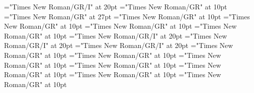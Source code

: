 \documentclass[a4paper]{article}
\begin{document}
\pagestyle{plain}
\sloppy
\setlength{\parfillskip}{0pt plus 1fil}
\font\pronunciationenUKpronunciationbefore="Times New Roman/GR/I" at 20pt
\font\sectionletterdictionary="Times New Roman/GR" at 10pt
\font\headsectionletterdictionary="Times New Roman/GR" at 27pt
\font\articledictionary="Times New Roman/GR" at 10pt
\font\firstoftypeheadwordlastoftypearticledictionary="Times New Roman/GR" at 10pt
\font\firstoftypegrammarrequireslastoftypearticledictionary="Times New Roman/GR" at 10pt
\font\firstoftypelastoftyperelationsynonymarticledictionary="Times New Roman/GR" at 10pt
\font\firstoftypepronunciationenUKarticledictionary="Times New Roman/GR/I" at 20pt
\font\lastoftypepronunciationenUSarticledictionary="Times New Roman/GR/I" at 20pt
\font\lastoftypepronunciationenUKarticledictionary="Times New Roman/GR/I" at 20pt
\font\firstoftypegrammarcategorylastoftypearticledictionary="Times New Roman/GR" at 10pt
\font{}="Times New Roman/GR" at 10pt
\font\firstoftypelastoftypenotearticledictionary="Times New Roman/GR" at 10pt
\font\exampleusefirstoftypearticledictionary="Times New Roman/GR" at 10pt
\font\examplefirstoftypearticledictionary="Times New Roman/GR" at 10pt
\font\exampleuselastoftypearticledictionary="Times New Roman/GR" at 10pt
\font\examplelastoftypearticledictionary="Times New Roman/GR" at 10pt

\mbox{} 
\newpage 
\newpage 
\setcounter{page}{1} 
\pagestyle{fancy} 
\begin{center}
\end{center}

\lastoftypepronunciationenUSarticledictionary{, }
\end{document}
